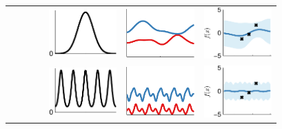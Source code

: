 \newcommand{\fw}{2.6cm}
\begin{figure}
\centering
\begin{tabular}{ccccc|c|c}
& & & & \includegraphics[width=\fw]{../figures/structure_examples/se_kernel} &  \includegraphics[width=\fw]{../figures/structure_examples/se_kernel_draws} & \includegraphics[width=\fw]{../figures/structure_examples/se_kernel_post} \\
& & & & \includegraphics[width=\fw]{../figures/structure_examples/per_kernel} &  \includegraphics[width=\fw]{../figures/structure_examples/per_kernel_draws} & \includegraphics[width=\fw]{../figures/structure_examples/per_kernel_post} \\

\end{tabular}
\end{figure}
